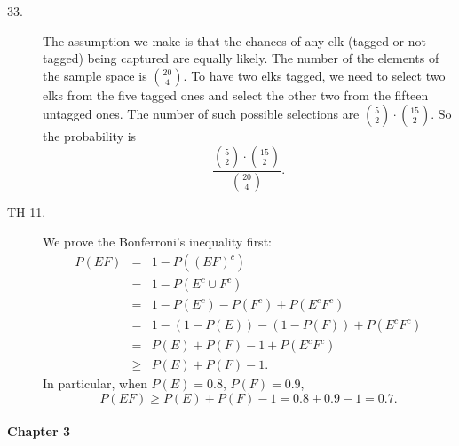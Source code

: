 \begin{description}
\item[{\rm 33.}] The assumption we make is that the chances of any 
elk (tagged or not tagged) being captured are equally likely. 
The number of the elements of the sample space is ${20\choose 4}$.
To have two elks tagged, we need to select two elks from the five 
tagged ones and select the other two from the fifteen untagged ones.
The number of such possible selections are ${5\choose 2}\cdot
{15\choose 2}$. So the probability is 
$$\frac{{5\choose 2}\cdot
{15\choose 2}}{{20\choose 4}}.$$


\item[{\rm TH 11.}] We prove the Bonferroni's inequality first:
\begin{eqnarray*}
P(EF)&=&1-P((EF)^{c})\\
&=&1-P(E^{c}\cup F^{c})\\
&=&1-P(E^{c})-P(F^{c})+P(E^{c}F^{c})\\
&=&1-(1-P(E))-(1-P(F))+P(E^{c}F^{c})\\
&=&P(E)+P(F)-1+P(E^{c}F^{c})\\
&\ge&P(E)+P(F)-1.
\end{eqnarray*}
In particular, when $P(E)=0.8$, $P(F)=0.9$,
$$P(EF)\ge P(E)+P(F)-1=0.8+0.9-1=0.7.$$

\end{description}

\paragraph{Chapter 3}

